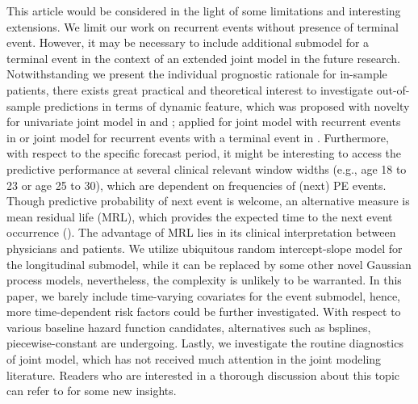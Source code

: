This article would be considered in the light of some limitations and interesting extensions. We limit our work on recurrent events without presence of terminal event. However, it may be necessary to include additional submodel for a terminal event in the context of an extended joint model in the future research. Notwithstanding we present the individual prognostic rationale for in-sample patients, there exists great practical and theoretical interest to investigate out-of-sample predictions in terms of dynamic feature, which was proposed with novelty for univariate joint model in \cite{Proust-Lima2009} and \cite{Rizopoulos2011}; applied for joint model with recurrent events in \cite{Ren2021} or joint model for recurrent events with a terminal event in \cite{Mauguen2013}. Furthermore, with respect to the specific forecast period, it might be interesting to access the predictive performance at several clinical relevant window widths (e.g., age 18 to 23 or age 25 to 30), which are dependent on frequencies of (next) PE events. Though predictive probability of next event is welcome, an alternative measure is mean residual life (MRL), which provides the expected time to the next event occurrence (\cite{Deep2020}). The advantage of MRL lies in its clinical interpretation between physicians and patients. We utilize ubiquitous random intercept-slope model for the longitudinal submodel, while it can be replaced by some other novel Gaussian process models, nevertheless, the complexity is unlikely to be warranted. In this paper, we barely include time-varying covariates for the event submodel, hence, more time-dependent risk factors could be further investigated. With respect to various baseline hazard function candidates, alternatives such as bsplines, piecewise-constant are undergoing. Lastly, we investigate the routine diagnostics of joint model, which has not received much attention in the joint modeling literature. Readers who are interested in a thorough discussion about this topic can refer to \cite{Rizopoulos2012d} for some new insights. 

